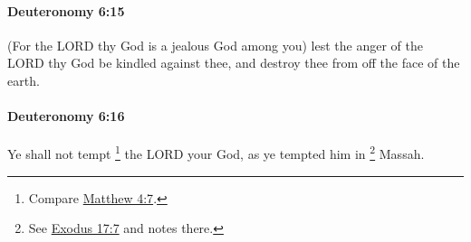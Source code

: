 		\paragraph{Deuteronomy 6:15} %
			\label{DEUTERONOMY-6-15}

			(For the LORD thy God is a jealous God among you) lest the anger of the LORD thy God be kindled against thee, and destroy thee from off the face of the earth.


		\paragraph{Deuteronomy 6:16} %
			\label{DEUTERONOMY-6-16}

			Ye shall not tempt%
				\footnote{%
					Compare \hyperref[MATTHEW-4-7]{Matthew 4:7}.
					}
			the LORD your God, as ye tempted him in
				\footnote{%
					See \hyperref[EXODUS-17-7]{Exodus 17:7} and notes there.
					}%
			Massah.

